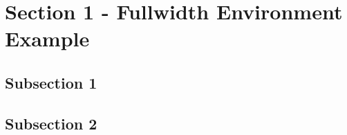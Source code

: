 
\section{Section 1 - Fullwidth Environment Example}

\begin{fullwidth}
\lipsum[5]
\end{fullwidth}

\subsection{Subsection 1}

\lipsum[6-7]

\subsection{Subsection 2}

\lipsum[7-8]
